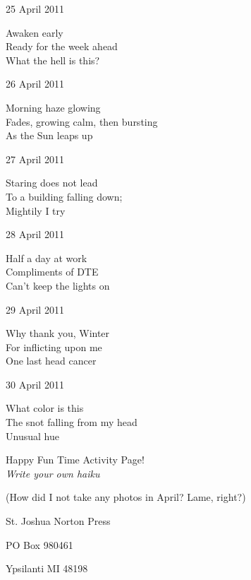 \documentclass[12pt]{article}
\begin{document}
25 April 2011

Awaken early \\
Ready for the week ahead \\
What the hell is this?

26 April 2011

Morning haze glowing \\
Fades, growing calm, then bursting \\
As the Sun leaps up

27 April 2011

Staring does not lead \\
To a building falling down; \\
Mightily I try

28 April 2011

Half a day at work \\
Compliments of DTE \\
Can't keep the lights on

29 April 2011

Why thank you, Winter \\
For inflicting upon me \\
One last head cancer

30 April 2011

What color is this \\
The snot falling from my head \\
Unusual hue



\newpage

\begin{center}
{\Large Happy Fun Time Activity Page!} \\
\emph{Write your own haiku}

\vspace*{\fill}

(How did I not take any photos in April? Lame, right?)
\end{center}



\newpage

\thispagestyle{empty}
\vspace*{12cm}
\begin{sideways}
\Large{St. Joshua Norton Press}
\end{sideways}
\begin{sideways}
\Large{PO Box 980461}
\end{sideways}
\begin{sideways}
\Large{Ypsilanti MI 48198}
\end{sideways}
\end{document}
